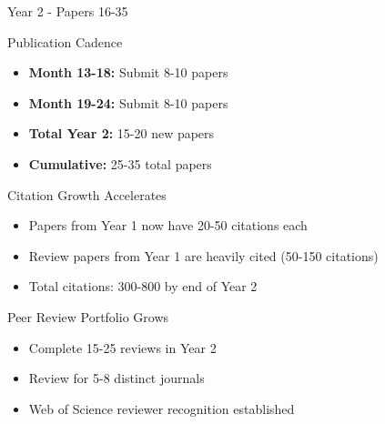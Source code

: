 \documentclass[11pt]{beamer}
\begin{document}
	\begin{frame}{Year 2 - Papers 16-35}
		\scriptsize
		\begin{block}{Publication Cadence}
			\begin{itemize}
				\item \textbf{Month 13-18:} Submit 8-10 papers
				\item \textbf{Month 19-24:} Submit 8-10 papers
				\item \textbf{Total Year 2:} 15-20 new papers
				\item \textbf{Cumulative:} 25-35 total papers
			\end{itemize}
		\end{block}
		\begin{block}{Citation Growth Accelerates}
			\begin{itemize}
				\item Papers from Year 1 now have 20-50 citations each
				\item Review papers from Year 1 are heavily cited (50-150 citations)
				\item Total citations: 300-800 by end of Year 2
			\end{itemize}
		\end{block}
		\begin{block}{Peer Review Portfolio Grows}
			\begin{itemize}
				\item Complete 15-25 reviews in Year 2
				\item Review for 5-8 distinct journals
				\item Web of Science reviewer recognition established
			\end{itemize}
		\end{block}
	\end{frame}
	
\end{document}
